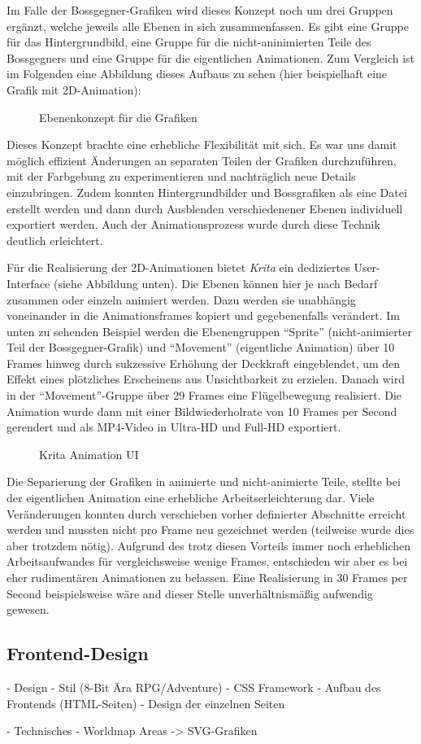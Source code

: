 Im Falle der Bossgegner-Grafiken wird dieses Konzept noch um drei Gruppen ergänzt, welche jeweils alle Ebenen in sich zusammenfassen. Es gibt eine Gruppe für das Hintergrundbild, eine Gruppe für die nicht-aninimierten Teile des Bossgegners und eine Gruppe für die eigentlichen Animationen.
Zum Vergleich ist im Folgenden eine Abbildung dieses Aufbaus zu sehen (hier beispielhaft eine Grafik mit 2D-Animation):

\begin{figure}[H]
    \centering
    \caption{Ebenenkonzept für die Grafiken}
    \label{fig:krita_layer_example}
\end{figure}

\pagebreak
Dieses Konzept brachte eine erhebliche Flexibilität mit sich. Es war uns damit möglich effizient Änderungen an separaten Teilen der Grafiken durchzuführen, mit der Farbgebung zu experimentieren und nachträglich neue Details einzubringen. Zudem konnten Hintergrundbilder und Bossgrafiken als eine Datei erstellt werden und dann durch Ausblenden verschiedenener Ebenen individuell exportiert werden. Auch der Animationsprozess wurde durch diese Technik deutlich erleichtert. 

Für die Realisierung der 2D-Animationen bietet \textit{Krita} ein dediziertes User-Interface (siehe Abbildung unten). Die Ebenen können hier je nach Bedarf zusammen oder einzeln animiert werden. Dazu werden sie unabhängig voneinander in die Animationsframes kopiert und gegebenenfalls verändert. Im unten zu sehenden Beispiel werden die Ebenengruppen \enquote{Sprite} (nicht-animierter Teil der Bossgegner-Grafik) und \enquote{Movement} (eigentliche Animation) über 10 Frames hinweg durch sukzessive Erhöhung der Deckkraft eingeblendet, um den Effekt eines plötzliches Erscheinens aus Unsichtbarkeit zu erzielen. Danach wird in der \enquote{Movement}-Gruppe über 29 Frames eine Flügelbewegung realisiert. Die Animation wurde dann mit einer Bildwiederholrate von 10 Frames per Second gerendert und als MP4-Video in Ultra-HD und Full-HD exportiert. 

\begin{figure}[H]
    \centering
    \caption{Krita Animation UI}
    \label{fig:krita_animation_example}
\end{figure}

Die Separierung der Grafiken in animierte und nicht-animierte Teile, stellte bei der eigentlichen Animation eine erhebliche Arbeitserleichterung dar. Viele Veränderungen konnten durch verschieben vorher definierter Abschnitte erreicht werden und mussten nicht pro Frame neu gezeichnet werden (teilweise wurde dies aber trotzdem nötig). Aufgrund des trotz diesen Vorteils immer noch erheblichen Arbeitsaufwandes für vergleichsweise wenige Frames, entschieden wir aber es bei eher rudimentären Animationen zu belassen. Eine Realisierung in 30 Frames per Second beispielsweise wäre and dieser Stelle unverhältnismäßig aufwendig gewesen.

\subsection{Frontend-Design}
    - Design
        - Stil (8-Bit Ära RPG/Adventure)
        - CSS Framework
        - Aufbau des Frontends (HTML-Seiten)
        - Design der einzelnen Seiten 

    - Technisches
        - Worldmap Areas -> SVG-Grafiken

    